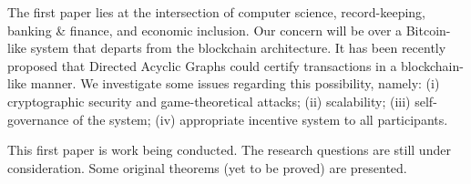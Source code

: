 
The first paper lies at the intersection of computer science, record-keeping, banking \& finance, and economic inclusion. Our concern will be over a Bitcoin-like system that departs from the blockchain architecture. It has been recently proposed that Directed Acyclic Graphs could certify transactions in a blockchain-like manner.  We investigate some issues regarding this possibility, namely: (i) cryptographic security and game-theoretical attacks; (ii) scalability; (iii) self-governance of the system; (iv) appropriate incentive system to all participants.  

This first paper is work being conducted. The research questions are still under consideration. Some original theorems (yet to be proved) are presented.

